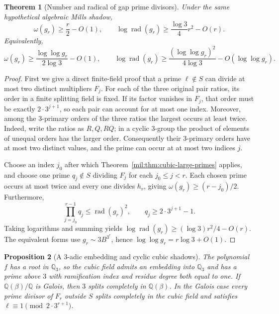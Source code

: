 \documentclass[11pt,a4paper]{article}
\newtheorem{theorem}{Theorem}[section]
\newtheorem{proposition}[theorem]{Proposition}
\theoremstyle{definition}
\theoremstyle{remark}
\numberwithin{equation}{section}
\begin{document}
\begin{theorem}[Number and radical of gap prime divisors]
\label{mil:thm:cubic-radical-growth}
Under the same hypothetical algebraic Mills shadow,
\[
 \omega(g_r)\geq\frac r2-O(1),\qquad
 \log\operatorname{rad}(g_r)
     \geq\frac{\log3}{4}r^2-O(r).
\]
Equivalently,
\[
 \omega(g_r)\geq\frac{\log\log g_r}{2\log3}-O(1),
 \qquad
 \log\operatorname{rad}(g_r)
 \geq\frac{(\log\log g_r)^2}{4\log3}-O(\log\log g_r).
\]
\end{theorem}

\begin{proof}
First we give a direct finite-field proof that a prime $\ell\notin S$
can divide at most two distinct multipliers $F_j$.
For each of the three original pair ratios, its order in a finite splitting
field is fixed.  If its factor vanishes in $F_j$, that order must be exactly
$2\cdot3^{j+1}$, so each pair can account for at most one index.
Moreover, among the $3$-primary orders of the three ratios the largest
occurs at least twice.  Indeed, write the ratios as $R,Q,RQ$; in a cyclic
$3$-group the product of elements of unequal orders has the larger order.
Consequently their $3$-primary orders have at most two distinct values,
and the prime can occur at at most two indices $j$.

Choose an index $j_0$ after which Theorem~\ref{mil:thm:cubic-large-primes}
applies, and choose one prime $q_j\notin S$ dividing $F_j$ for each
$j_0\leq j<r$.  Each chosen prime occurs at most twice and every one divides
$h_r$, giving $\omega(g_r)\geq(r-j_0)/2$.
Furthermore,
\[
 \prod_{j=j_0}^{r-1}q_j\leq\operatorname{rad}(g_r)^2,
 \qquad q_j\geq2\cdot3^{j+1}-1.
\]
Taking logarithms and summing yields
$\log\operatorname{rad}(g_r)\geq(\log3)r^2/4-O(r)$.
The equivalent forms use $g_r\sim3B^{3^r}$, hence
$\log\log g_r=r\log3+O(1)$.
\end{proof}

\begin{proposition}[A $3$-adic embedding and cyclic cubic shadows]
\label{mil:prop:cubic-split-three}
The polynomial $f$ has a root in $\mathbb Q_3$, so the cubic field admits
an embedding into $\mathbb Q_3$ and has a prime above $3$ with ramification
index and residue degree both equal to one.
If $\mathbb Q(\beta)/\mathbb Q$ is Galois, then $3$ splits completely in
$\mathbb Q(\beta)$.  In the Galois case every prime divisor of $F_r$ outside $S$
splits completely in the cubic field and satisfies
$\ell\equiv1\pmod{2\cdot3^{r+1}}$.
\end{proposition}
\end{document}
